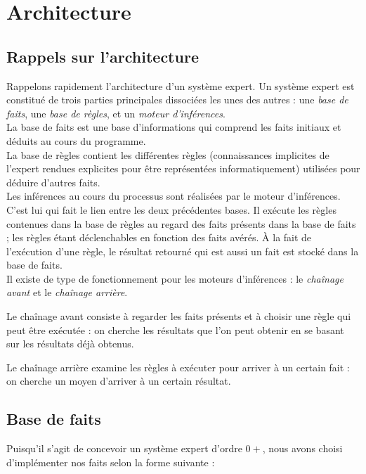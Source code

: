 \documentclass[a4paper,12pt]{article}
\begin{document}
\section{Architecture}

\subsection{Rappels sur l'architecture}
Rappelons rapidement l'architecture d'un système expert.
Un système expert est constitué de trois parties principales dissociées les unes des autres : une \textit{base de faits}, une \textit{base de règles}, et un \textit{moteur d'inférences}.\\

La base de faits est une base d'informations qui comprend les faits initiaux et déduits au cours du programme.\\

La base de règles contient les différentes règles (connaissances implicites de l'expert rendues explicites pour être représentées informatiquement) utilisées pour déduire d'autres faits.\\

Les inférences au cours du processus sont réalisées par le moteur d'inférences. C'est lui qui fait le lien entre les deux précédentes bases. Il exécute les règles contenues dans la base de règles au regard des faits présents dans la base de faits ; les règles étant déclenchables en fonction des faits avérés. À la fait de l'exécution d'une règle, le résultat retourné qui est aussi un fait est stocké dans la base de faits.\\

Il existe de type de fonctionnement pour les moteurs d'inférences : le \textit{chaînage avant} et le \textit{chaînage arrière}.

Le chaînage avant consiste à regarder les faits présents et à choisir une règle qui peut être exécutée : on cherche les résultats que l'on peut obtenir en se basant sur les résultats déjà obtenus.

Le chaînage arrière examine les règles à exécuter pour arriver à un certain fait : on cherche un moyen d'arriver à un certain résultat.

\subsection{Base de faits}

Puisqu'il s'agit de concevoir un système expert d'ordre $0+$, nous avons choisi d'implémenter nos faits selon la forme suivante :
\end{document}
